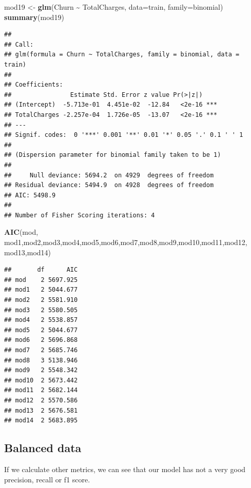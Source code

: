 \documentclass[
  twoside]{article}
\newenvironment{Shaded}{\begin{snugshade}}{\end{snugshade}}
\newcommand{\AttributeTok}[1]{\textcolor[rgb]{0.13,0.29,0.53}{#1}}
\newcommand{\FunctionTok}[1]{\textcolor[rgb]{0.13,0.29,0.53}{\textbf{#1}}}
\newcommand{\NormalTok}[1]{#1}
\newcommand{\OtherTok}[1]{\textcolor[rgb]{0.56,0.35,0.01}{#1}}
\newcommand{\SpecialCharTok}[1]{\textcolor[rgb]{0.81,0.36,0.00}{\textbf{#1}}}
\begin{document}
\begin{Shaded}
\begin{Highlighting}[]
\NormalTok{mod19 }\OtherTok{\textless{}{-}} \FunctionTok{glm}\NormalTok{(Churn }\SpecialCharTok{\textasciitilde{}}\NormalTok{ TotalCharges, }\AttributeTok{data=}\NormalTok{train, }\AttributeTok{family=}\NormalTok{binomial)}
\FunctionTok{summary}\NormalTok{(mod19)}
\end{Highlighting}
\end{Shaded}

\begin{verbatim}
## 
## Call:
## glm(formula = Churn ~ TotalCharges, family = binomial, data = train)
## 
## Coefficients:
##                Estimate Std. Error z value Pr(>|z|)    
## (Intercept)  -5.713e-01  4.451e-02  -12.84   <2e-16 ***
## TotalCharges -2.257e-04  1.726e-05  -13.07   <2e-16 ***
## ---
## Signif. codes:  0 '***' 0.001 '**' 0.01 '*' 0.05 '.' 0.1 ' ' 1
## 
## (Dispersion parameter for binomial family taken to be 1)
## 
##     Null deviance: 5694.2  on 4929  degrees of freedom
## Residual deviance: 5494.9  on 4928  degrees of freedom
## AIC: 5498.9
## 
## Number of Fisher Scoring iterations: 4
\end{verbatim}

\begin{Shaded}
\begin{Highlighting}[]
\FunctionTok{AIC}\NormalTok{(mod, mod1,mod2,mod3,mod4,mod5,mod6,mod7,mod8,mod9,mod10,mod11,mod12, mod13,mod14)}
\end{Highlighting}
\end{Shaded}

\begin{verbatim}
##       df      AIC
## mod    2 5697.925
## mod1   2 5044.677
## mod2   2 5581.910
## mod3   2 5580.505
## mod4   2 5538.857
## mod5   2 5044.677
## mod6   2 5696.868
## mod7   2 5685.746
## mod8   3 5138.946
## mod9   2 5548.342
## mod10  2 5673.442
## mod11  2 5682.144
## mod12  2 5570.586
## mod13  2 5676.581
## mod14  2 5683.895
\end{verbatim}

\hypertarget{balanced-data}{%
\subsection{Balanced data}\label{balanced-data}}

If we calculate other metrics, we can see that our model has not a very
good precision, recall or f1 score.
\end{document}
